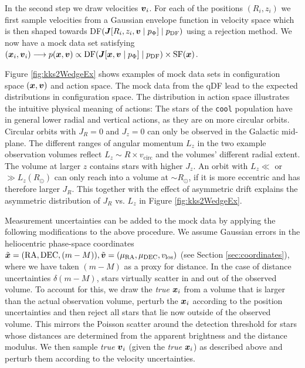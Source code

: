 In the second step we draw velocities $\boldsymbol{v}_i$. For each of the positions $(R_i,z_i)$ we first sample velocities from a Gaussian envelope function in velocity space which is then shaped towards DF$(\boldsymbol{J}[R_i,z_i,\boldsymbol{v} \mid p_{\Phi}] \mid p_\text{DF})$ using a rejection method. We now have a mock data set satisfying $(\boldsymbol{x}_i,\boldsymbol{v}_i) \longrightarrow p(\boldsymbol{x},\boldsymbol{v}) \propto \text{DF}(\boldsymbol{J}[\boldsymbol{x},\boldsymbol{v} \mid p_{\Phi}] \mid p_\text{DF}) \times \text{SF}(\boldsymbol{x})$.


Figure \ref{fig:kks2WedgeEx} shows examples of mock data sets in configuration space $(\boldsymbol{x},\boldsymbol{v})$ and action space. The mock data from the qDF lead to the expected distributions in configuration space. The distribution in action space illustrates the intuitive physical meaning of actions: The stars of the \texttt{cool} population have in general lower radial and vertical actions, as they are on more circular orbits. Circular orbits with $J_R = 0$ and $J_z = 0$ can only be observed in the Galactic mid-plane. The different ranges of angular momentum $L_z$ in the two example observation volumes reflect $L_z \sim R  \times v_\text{circ}$ and the volumes' different radial extent. The volume at larger $z$ contains stars with higher $J_z$.  An orbit with $L_z \ll$ or $\gg L_z(R_\odot)$ can only reach into a volume at $\sim R_\odot$, if it is more eccentric and has therefore larger $J_R$. This together with the effect of asymmetric drift explains the asymmetric distribution of $J_R$ vs. $L_z$ in Figure \ref{fig:kks2WedgeEx}.


Measurement uncertainties can be added to the mock data by applying the following modifications to the above procedure. We assume Gaussian errors in the heliocentric phase-space coordinates $\tilde{\boldsymbol{x}} = (\text{RA},\text{DEC},(m-M)), \tilde{\boldsymbol{v}} = (\mu_\text{RA},\mu_\text{DEC},v_\text{los})$ (see Section \ref{sec:coordinates}), where we have taken $(m-M)$ as a proxy for distance. In the case of distance uncertainties $\delta(m-M)$, stars virtually scatter in and out of the observed volume. To account for this, we draw the \emph{true} $\boldsymbol{x}_i$ from a volume that is larger than the actual observation volume, perturb the $\boldsymbol{x}_i$ according to the position uncertainties and then reject all stars that lie now outside of the observed volume. This mirrors the Poisson scatter around the detection threshold for stars whose distances are determined from the apparent brightness and the distance modulus. We then sample \emph{true} $\boldsymbol{v}_i$ (given the \emph{true} $\boldsymbol{x}_i$) as described above and perturb them according to the velocity uncertainties.

